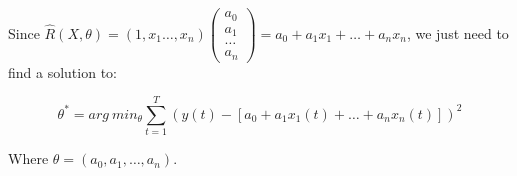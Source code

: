 Since $\hat{R}(X, \theta) = (1, x_1 \dots, x_n) \left( \begin{smallmatrix}
a_0\\ a_1\\ \dots \\ a_n \end{smallmatrix} \right) = a_0 + a_1x_1 + \dots +
a_nx_n$, we just need to find a solution to:

\[
  \theta^* = arg~min_\theta \sum^T_{t=1}(y(t) - [a_0 + a_1x_1(t) + \dots +
a_nx_n(t)])^2
\]

Where $\theta = (a_0, a_1, \dots, a_n)$.

